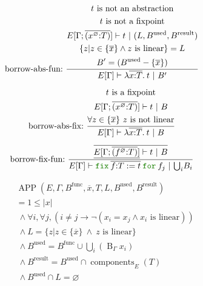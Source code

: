 \documentclass[a4paper,fleqn]{article}
\newcommand{\kwfix}{\mbox{\color{mygreen}\ttfamily fix}}
\newcommand{\kwfor}{\mbox{\color{mygreen}\ttfamily for}}
\newcommand{\lam}[2]{\lambda #1.\:#2}
\newcommand{\lassum}[2]{(#1\mathord{:}#2)}
\newcommand{\ofix}[2]{\kwfix\:{#1}\:\kwfor\:{#2}}
\newcommand{\tbigcup}{{\textstyle\bigcup}}
\newcommand{\breakrule}{\\[0.5em]}
\DeclareMathOperator{\APP}{APP}
\DeclareMathOperator{\components}{components}
\DeclareMathOperator{\Bop}{B}
\newcommand{\rep}[1]{\overline{#1}}
\begin{document}
\begin{gather*}
  \text{borrow-abs-fun:}~
    \dfrac{
      \begin{gathered}
        \text{$t$ is not an abstraction} \\
        \text{$t$ is not a fixpoint} \\
        E[\Gamma;\rep{\lassum{x^\varnothing}{T}}] \vdash t ~|~ (L,B^\text{used},B^\text{result}) \\
        \{ z | z \in \{\rep{x}\} \wedge \text{$z$ is linear} \} = L \\
        B' = (B^\text{used} - \{\rep{x}\}) \\
      \end{gathered}
    }{
      E[\Gamma] \vdash \lam{\rep{x{:}T}}{t} ~|~ B'
    } \breakrule
  \text{borrow-abs-fix:}~
    \dfrac{
      \begin{gathered}
        \text{$t$ is a fixpoint} \\
        E[\Gamma;\rep{\lassum{x^\varnothing}{T}}] \vdash t ~|~ B \\
        \forall z \in \{\rep{x}\}~ \text{$z$ is not linear} \\
      \end{gathered}
    }{
      E[\Gamma] \vdash \lam{\rep{x{:}T}}{t} ~|~ B
    } \breakrule
  \text{borrow-fix-fun:}~
    \dfrac{
      \begin{gathered}
        \rep{\underline{E[\Gamma;\rep{\lassum{f^\varnothing}{T}}]} \vdash t ~|~ B} \\
      \end{gathered}
    }{
      E[\Gamma] \vdash \ofix{\rep{f{:}T:=t}}{f_j} ~|~ {\tbigcup_i B_i}
    }
\end{gather*}

\begin{align*}
  &\APP(E, \Gamma, B^\text{func}, \rep{x}, T, L, B^\text{used}, B^\text{result}) \\
  &= 1 \leq |x| \\
  &~\wedge \forall i, \forall j, (i \neq j \rightarrow \neg (x_i = x_j \wedge \text{$x_i$ is linear})) \\
  &~\wedge L = \{ z | z \in \{\rep{x}\} ~\wedge~ \text{$z$ is linear} \} \\
  &~\wedge B^\text{used} = B^\text{func} \cup \tbigcup_i (\Bop_\Gamma x_i) \\
  &~\wedge B^\text{result} = B^\text{used} \cap \components_E(T) \\
  &~\wedge B^\text{used} \cap L = \varnothing \\
\end{align*}
\end{document}
